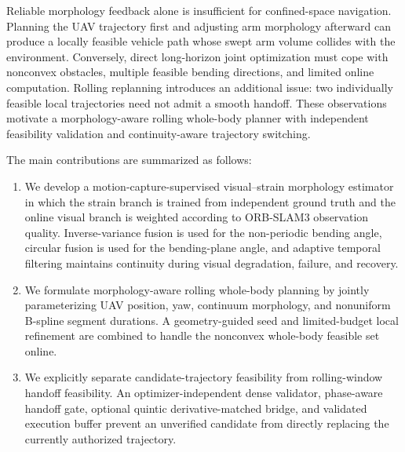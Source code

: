 \documentclass[journal,twoside]{IEEEtran}
\begin{document}
Reliable morphology feedback alone is insufficient for confined-space navigation. Planning the UAV trajectory first and adjusting arm morphology afterward can produce a locally feasible vehicle path whose swept arm volume collides with the environment. Conversely, direct long-horizon joint optimization must cope with nonconvex obstacles, multiple feasible bending directions, and limited online computation. Rolling replanning introduces an additional issue: two individually feasible local trajectories need not admit a smooth handoff. These observations motivate a morphology-aware rolling whole-body planner with independent feasibility validation and continuity-aware trajectory switching.

The main contributions are summarized as follows:
\begin{enumerate}
    \item We develop a motion-capture-supervised visual--strain morphology estimator in which the strain branch is trained from independent ground truth and the online visual branch is weighted according to ORB-SLAM3 observation quality. Inverse-variance fusion is used for the non-periodic bending angle, circular fusion is used for the bending-plane angle, and adaptive temporal filtering maintains continuity during visual degradation, failure, and recovery.

    \item We formulate morphology-aware rolling whole-body planning by jointly parameterizing UAV position, yaw, continuum morphology, and nonuniform B-spline segment durations. A geometry-guided seed and limited-budget local refinement are combined to handle the nonconvex whole-body feasible set online.

    \item We explicitly separate candidate-trajectory feasibility from rolling-window handoff feasibility. An optimizer-independent dense validator, phase-aware handoff gate, optional quintic derivative-matched bridge, and validated execution buffer prevent an unverified candidate from directly replacing the currently authorized trajectory.
\end{enumerate}
\end{document}
